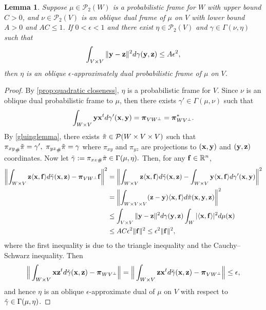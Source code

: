 \documentclass{amsart}
\numberwithin{equation}{section}
\newcommand{\bpi}{{\boldsymbol{\pi}}}
\theoremstyle{plain}
\newtheorem{lemma}[theorem]{Lemma}
\theoremstyle{remark}
\theoremstyle{definition}
\begin{document}
\begin{lemma}\label{pertubedFrame}
Suppose $\mu \in \mathcal{P}_2(W)$ is a probabilistic frame for $W$ with upper bound $C>0$, and $\nu  \in \mathcal{P}_2(V)$ is an oblique dual frame of $\mu$ on $V$ with lower bound $A>0$ and $AC\leq 1$.  If $0< \epsilon <1$ and there exist $\eta \in \mathcal{P}_2(V)$ and $\gamma \in \Gamma(\nu, \eta) $ such that
    \begin{equation*}
        \int_{V \times V} \| {\bf y}- {\bf z} \|^2 d\gamma({\bf y},{\bf z})  \leq A \epsilon^2,
    \end{equation*}
 then $\eta$ is an oblique $\epsilon$-approximately dual probabilistic frame of $\mu$ on $V$.
\end{lemma}
\begin{proof}
By \cref{prop:quadratic closeness}, $\eta$ is a probabilistic frame for $V$. Since $\nu$ is an oblique dual probabilistic frame to $\mu$, then there exists  $\gamma' \in \Gamma(\mu, \nu)$ such that
     \begin{equation*}
      \int_{W \times V} {\bf y}{\bf x}^t d\gamma'({\bf x, y}) = \bpi_{VW^\perp} = \bpi_{WV^\perp}^*.
    \end{equation*}
By \cref{gluinglemma}, there exists $\Tilde{\pi} \in \mathcal{P}(W \times V \times V)$ such that ${\pi_{xy}}_{\#}\Tilde{\pi} = \gamma', \  {\pi_{yz}}_{\#}\Tilde{\pi} = \gamma$ where $\pi_{xy}$ and $\pi_{yz}$ are projections to $({\bf x},{\bf y})$ and $({\bf y},{\bf z})$ coordinates. Now let $\Tilde{\gamma}:= {\pi_{xz}}_{\#}\Tilde{\pi} \in \Gamma(\mu, \eta). $
Then, for any ${\bf f} \in \mathbb{R}^n$, 
 \begin{equation*}
 \begin{split}
     \left \| \int_{W \times V} {\bf z} \langle {\bf x}, {\bf f} \rangle d\Tilde{\gamma}({\bf x, z}) - \bpi_{VW^\perp}{\bf f} \right \|^2
      &=  \left \|\int_{W \times V} {\bf z} \langle {\bf x}, {\bf f} \rangle d\Tilde{\gamma}({\bf x, z}) - \int_{W \times V} {\bf y}\langle {\bf x}, {\bf f} \rangle  d\gamma'({\bf x, y}) \right \|^2 \\
      &= \left \|\int_{W \times V \times V} ({\bf z -y}) \langle {\bf x}, {\bf f} \rangle d\Tilde{\pi}({\bf x, y, z})\right \|^2 \\
      & \leq \int_{V \times V}  \| {\bf y -z} \|^2   d\gamma({\bf y, z})   \int_{W}  |\langle {\bf x}, {\bf f} \rangle|^2  d\mu({\bf x}) \\
      & \leq AC \epsilon^2 \| {\bf f}\|^2 \leq \epsilon^2 \| {\bf f}\|^2,
 \end{split}
    \end{equation*}
where the first inequality is due to the triangle inequality and the Cauchy–Schwarz inequality. Then
\begin{equation*}
   \Big \| \int_{W \times V} {\bf x} {\bf z}^t d\Tilde{\gamma}({\bf x, z}) - \bpi_{WV^\perp} \Big \| = \Big \| \int_{W \times V} {\bf z} {\bf x}^t d\Tilde{\gamma}({\bf x, z}) - \bpi_{VW^\perp} \Big \| \leq \epsilon,
\end{equation*}
and hence $\eta$ is an oblique $\epsilon$-approximate dual of $\mu$ on $V$ with respect to $\Tilde{\gamma} \in \Gamma(\mu, \eta)$.
\end{proof}
\end{document}
